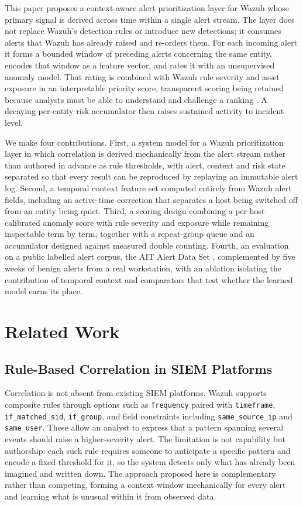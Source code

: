 \documentclass[conference]{IEEEtran}
\begin{document}
This paper proposes a context-aware alert prioritization layer for Wazuh whose primary signal is derived across time within a single alert stream. The layer does not replace Wazuh's detection rules or introduce new detections; it consumes alerts that Wazuh has already raised and re-orders them. For each incoming alert it forms a bounded window of preceding alerts concerning the same entity, encodes that window as a feature vector, and rates it with an unsupervised anomaly model. That rating is combined with Wazuh rule severity and asset exposure in an interpretable priority score, transparent scoring being retained because analysts must be able to understand and challenge a ranking \cite{ref9,ref10}. A decaying per-entity risk accumulator then raises sustained activity to incident level.

We make four contributions. First, a system model for a Wazuh prioritization layer in which correlation is derived mechanically from the alert stream rather than authored in advance as rule thresholds, with alert, context and risk state separated so that every result can be reproduced by replaying an immutable alert log. Second, a temporal context feature set computed entirely from Wazuh alert fields, including an active-time correction that separates a host being switched off from an entity being quiet. Third, a scoring design combining a per-host calibrated anomaly score with rule severity and exposure while remaining inspectable term by term, together with a repeat-group queue and an accumulator designed against measured double counting. Fourth, an evaluation on a public labelled alert corpus, the AIT Alert Data Set \cite{ref21}, complemented by five weeks of benign alerts from a real workstation, with an ablation isolating the contribution of temporal context and comparators that test whether the learned model earns its place.

\section{Related Work}
\label{sec:related}

\subsection{Rule-Based Correlation in SIEM Platforms}

Correlation is not absent from existing SIEM platforms. Wazuh supports composite rules through options such as \texttt{frequency} paired with \texttt{timeframe}, \texttt{if\_matched\_sid}, \texttt{if\_group}, and field constraints including \texttt{same\_source\_ip} and \texttt{same\_user}. These allow an analyst to express that a pattern spanning several events should raise a higher-severity alert. The limitation is not capability but authorship: each such rule requires someone to anticipate a specific pattern and encode a fixed threshold for it, so the system detects only what has already been imagined and written down. The approach proposed here is complementary rather than competing, forming a context window mechanically for every alert and learning what is unusual within it from observed data.
\end{document}
